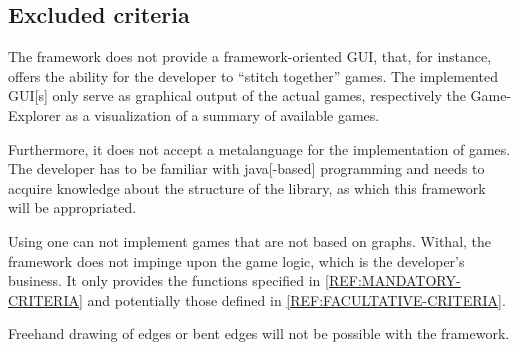\subsection{Excluded criteria}
The {\graphioli} framework does not provide a framework-oriented \gls{GUI}, that, for instance, offers the ability for the developer to ``stitch together'' games. The implemented \gls{GUI}[s] only serve as graphical output of the actual games, respectively the Game-Explorer as a visualization of a summary of available games.\par
Furthermore, it does not accept a \gls{metalanguage} for the implementation of games. The \gls{developer} has to be familiar with \Gls{java}[-based] programming and needs to acquire knowledge about the structure of the \gls{library}, as which this framework will be appropriated.\par
Using {\graphioli} one can not implement \glspl{game} that are not based on \glspl{graph}. Withal, the framework does not impinge upon the game logic, which is the developer's business. It only provides the functions specified in \ref{REF:MANDATORY-CRITERIA} and potentially those defined in \ref{REF:FACULTATIVE-CRITERIA}.\par
Freehand drawing of \glspl{edge} or bent edges will not be possible with the {\graphioli} framework.\par
